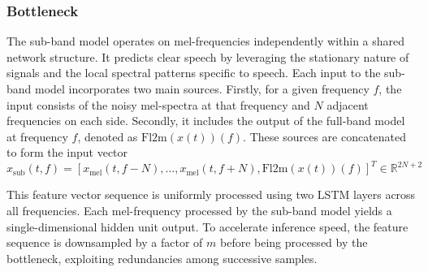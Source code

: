 \subsubsection{Bottleneck}
The sub-band model operates on mel-frequencies independently within a shared network structure. It predicts clear speech by leveraging
the stationary nature of signals and the local spectral patterns specific to speech. Each input to the sub-band model incorporates two main sources.
Firstly, for a given frequency \( f \), the input consists of the noisy mel-spectra at that frequency and \( N \) adjacent frequencies on each side.
Secondly, it includes the output of the full-band model at frequency \( f \), denoted as \( \text{Fl2m}(x(t))(f) \). These sources are concatenated
to form the input vector
\begin{equation}
    \label{eq:fast-fullsubnet-input}
    x_{\text{sub}}(t, f) = [x_{\text{mel}}(t, f - N), \ldots, x_{\text{mel}}(t, f + N), \text{Fl2m}(x(t))(f)]^T \in \mathbb{R}^{2N+2}
\end{equation}

This feature vector sequence is uniformly processed using two LSTM layers across all frequencies. Each mel-frequency processed by the sub-band model yields a
single-dimensional hidden unit output.
To accelerate inference speed, the feature sequence is downsampled by a factor of \( m \) before being processed by the bottleneck, exploiting redundancies among
successive samples.

